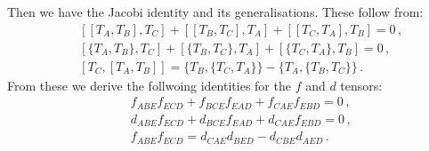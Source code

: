 \documentclass[12pt,a4paper]{article}
\begin{document}
Then we have the Jacobi identity and its generalisations.
These follow from:
\begin{eqnarray}
  &&[[T_A,T_B],T_C] + [[T_B,T_C],T_A]  +[[T_C,T_A],T_B]=0\,,
  \nonumber\\
  &&[\{T_A,T_B\},T_C] + [\{T_B,T_C\},T_A]  + [\{T_C,T_A\},T_B]=0\,,
  \nonumber\\
  &&[T_C,[T_A,T_B]] = \{T_B,\{T_C,T_A\}\} - \{T_A,\{T_B,T_C\}\}\,.
\end{eqnarray}
{From} these we derive the follwoing identities
for the $f$ and $d$ tensors:
\begin{eqnarray}
\label{ff}
  &&f_{ABE}f_{ECD} + f_{BCE}f_{EAD} + f_{CAE}f_{EBD} = 0\,,
  \\
\label{fd}
  &&d_{ABE}f_{ECD} + d_{BCE}f_{EAD} + d_{CAE}f_{EBD} = 0\,,
  \\
\label{ffdd}
  && f_{ABE}f_{ECD} =  d_{CAE}d_{BED} - d_{CBE}d_{AED}\,.
\end{eqnarray}
\end{document}
